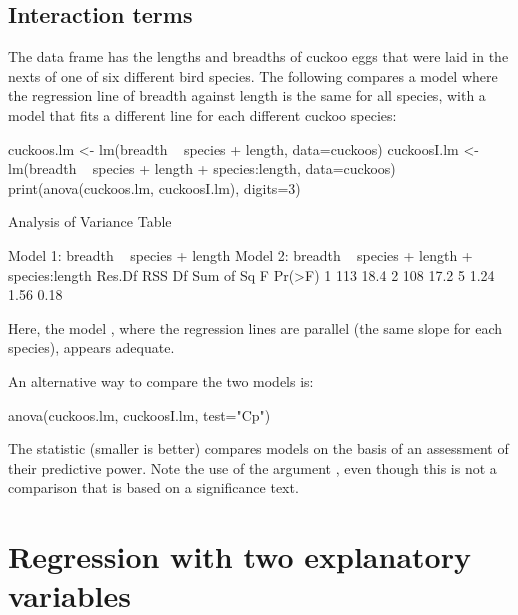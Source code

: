 \subsection*{Interaction terms}
The data frame  has the lengths and breadths of cuckoo
eggs that were laid in the nexts of one of six different bird species.
The following compares a model where the regression line of
breadth against length is the same for all species, with a
model that fits a different line for each different cuckoo species:
\begin{fullwidth}
\begin{Schunk}
\begin{Sinput}
cuckoos.lm <- lm(breadth ~ species + length, data=cuckoos)
cuckoosI.lm <- lm(breadth ~ species + length + species:length, data=cuckoos)
print(anova(cuckoos.lm, cuckoosI.lm), digits=3)
\end{Sinput}
\begin{Soutput}
Analysis of Variance Table

Model 1: breadth ~ species + length
Model 2: breadth ~ species + length + species:length
  Res.Df  RSS Df Sum of Sq    F Pr(>F)
1    113 18.4                         
2    108 17.2  5      1.24 1.56   0.18
\end{Soutput}
\end{Schunk}
\end{fullwidth}

\noindent Here, the model , where the regression lines are
parallel (the same slope for each species), appears adequate.

An alternative way to compare the two models is:
\begin{Schunk}
\begin{Sinput}
anova(cuckoos.lm, cuckoosI.lm, test="Cp")
\end{Sinput}
\end{Schunk}
The  statistic (smaller is better) compares models on the basis
of an assessment of their predictive power. Note the use of the
argument , even though this is not a comparison
that is based on a significance text.

\section{Regression with two explanatory variables}\label{sec:nihills-reg}

